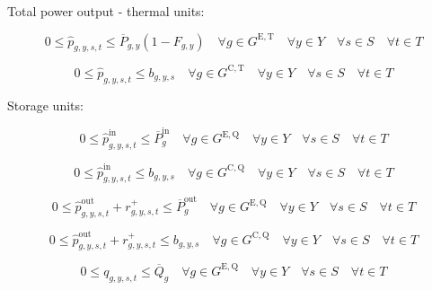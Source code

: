 \documentclass{article}
\newcommand{\sGeneratorsExistingThermal}{G^{\mathrm{E,T}}}
\newcommand{\sGeneratorsCandidateThermal}{G^{\mathrm{C,T}}}
\newcommand{\sStorageExisting}{G^{\mathrm{E,Q}}}
\newcommand{\sStorageCandidate}{G^{\mathrm{C,Q}}}
\newcommand{\sYears}{Y}
\newcommand{\sScenarios}{S}
\newcommand{\sIntervals}{T}
\newcommand{\iGenerator}{g}
\newcommand{\iYear}{y}
\newcommand{\iScenario}{s}
\newcommand{\iInterval}{t}
\newcommand{\cPowerOutputMax}[1][\iGenerator,\iYear]{\overline{P}_{#1}}
\newcommand{\cPowerChargingMax}[1][\iGenerator]{\overline{P}^{\mathrm{in}}_{#1}}
\newcommand{\cPowerDischargingMax}[1][\iGenerator]{\overline{P}^{\mathrm{out}}_{#1}}
\newcommand{\cStorageUnitEnergyMax}[1][\iGenerator]{\overline{Q}_{#1}}
\newcommand{\cRetirementIndicator}[1][\iGenerator,\iYear]{F_{#1}}
\newcommand{\vReserveUp}[1][\iGenerator,\iYear,\iScenario,\iInterval]{r^{+}_{#1}}
\newcommand{\vPowerTotal}[1][\iGenerator,\iYear,\iScenario,\iInterval]{\hat{p}_{#1}}
\newcommand{\vPowerTotalIn}[1][\iGenerator,\iYear,\iScenario,\iInterval]{\hat{p}^{\mathrm{in}}_{#1}}
\newcommand{\vPowerTotalOut}[1][\iGenerator,\iYear,\iScenario,\iInterval]{\hat{p}^{\mathrm{out}}_{#1}}
\newcommand{\vStorageUnitEnergy}[1][\iGenerator,\iYear,\iScenario,\iInterval]{q_{#1}}
\newcommand{\vInstalledCapacityTotalScenario}[1][\iGenerator,\iYear,\iScenario]{b_{#1}}
\begin{document}
Total power output - thermal units:

\begin{equation}
0 \leq \vPowerTotal \leq \cPowerOutputMax \left(1 - \cRetirementIndicator \right) \quad \forall \iGenerator \in \sGeneratorsExistingThermal \quad \forall \iYear \in \sYears \quad \forall \iScenario \in \sScenarios \quad \forall \iInterval \in \sIntervals
\end{equation}

\begin{equation}
0 \leq \vPowerTotal \leq \vInstalledCapacityTotalScenario \quad \forall \iGenerator \in \sGeneratorsCandidateThermal \quad \forall \iYear \in \sYears \quad \forall \iScenario \in \sScenarios \quad \forall \iInterval \in \sIntervals
\end{equation}

Storage units:

\begin{equation}
0 \leq \vPowerTotalIn \leq \cPowerChargingMax \quad \forall \iGenerator \in \sStorageExisting \quad \forall \iYear \in \sYears \quad \forall \iScenario \in \sScenarios \quad \forall \iInterval \in \sIntervals
\end{equation}

\begin{equation}
0 \leq \vPowerTotalIn \leq \vInstalledCapacityTotalScenario \quad \forall \iGenerator \in \sStorageCandidate \quad \forall \iYear \in \sYears \quad \forall \iScenario \in \sScenarios \quad \forall \iInterval \in \sIntervals
\end{equation}

\begin{equation}
0 \leq \vPowerTotalOut + \vReserveUp \leq \cPowerDischargingMax \quad \forall \iGenerator \in \sStorageExisting \quad \forall \iYear \in \sYears \quad \forall \iScenario \in \sScenarios \quad \forall \iInterval \in \sIntervals
\end{equation}

\begin{equation}
0 \leq \vPowerTotalOut + \vReserveUp \leq \vInstalledCapacityTotalScenario \quad \forall \iGenerator \in \sStorageCandidate \quad \forall \iYear \in \sYears \quad \forall \iScenario \in \sScenarios \quad \forall \iInterval \in \sIntervals
\end{equation}

\begin{equation}
0 \leq \vStorageUnitEnergy \leq \cStorageUnitEnergyMax \quad \forall \iGenerator \in \sStorageExisting \quad \forall \iYear \in \sYears \quad \forall \iScenario \in \sScenarios \quad \forall \iInterval \in \sIntervals
\end{equation}
\end{document}
